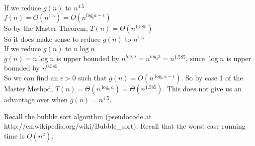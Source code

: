 \documentclass[addpoints]{exam}
\begin{document}
\begin{questions}
\begin{parts}
If we reduce $g(n)$ to $n^{1.5}$\\
$f(n) =  O(n^{1.5})=O(n^{log_b a - \epsilon})$\\
So by the Master Theorem, $T(n) = \Theta(n^{1.585})$\\
So it does make sense to reduce $g(n)$ to $n^{1.5}$\\

If we reduce $g(n)$ to $n \log n$\\
$g(n)= n\log n$ is upper bounded by $n^{log_b a} = n^{log_2 3} =n^{1.585}$, since $\log n$ is upper bounded by $n^{0.585}$.\\
So we can find an $\epsilon > 0$ such that $g(n) =O(n^{\log_b a-\epsilon})$.
So by case 1 of the Master Method, $T(n) = \Theta(n^{\log_b a}) = \Theta(n^{1.585})$.
This does not give us an advantage over when $g(n)=n^{1.5}$.
\end{parts}

\color{qcolor}
Recall the bubble sort algorithm (pseudocode at {\sf http://en.wikipedia.org/wiki/Bubble\_sort}). Recall that the worst case running time is $O(n^2)$.

\color{acolor}
\begin{parts}

\end{parts}
\end{questions}
\end{document}
